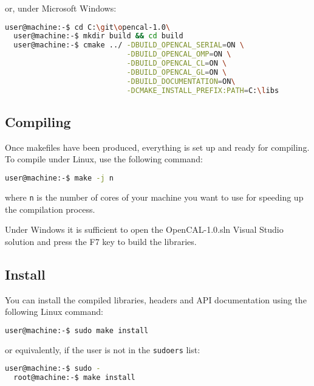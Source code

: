 \noindent or, under Microsoft Windows:

\begin{lstlisting}[numbers=none,language=bash,label={ch:quickstart:simplebuild}]
  user@machine:-$ cd C:\git\opencal-1.0\
  user@machine:-$ mkdir build && cd build
  user@machine:-$ cmake ../ -DBUILD_OPENCAL_SERIAL=ON \
                            -DBUILD_OPENCAL_OMP=ON \
                            -DBUILD_OPENCAL_CL=ON \
                            -DBUILD_OPENCAL_GL=ON \
                            -DBUILD_DOCUMENTATION=ON\
                            -DCMAKE_INSTALL_PREFIX:PATH=C:\libs
\end{lstlisting}


\subsection{Compiling}
Once makefiles have been produced, everything is set up and ready for
compiling. To compile under Linux, use the following command:

\begin{lstlisting}[numbers=none,language=bash,label={ch:quickstart:ebuild}]
  user@machine:-$ make -j n
\end{lstlisting}
where \verb'n' is the number of cores of your machine you want to use
for speeding up the compilation process.

Under Windows it is sufficient to open the OpenCAL-1.0.sln Visual
Studio solution and press the F7 key to build the libraries.

\subsection{Install}

You can install the compiled libraries, headers and API documentation
using the following Linux command:

\begin{lstlisting}[numbers=none,language=bash,label={ch:quickstart:sudoinstall}]
  user@machine:-$ sudo make install
\end{lstlisting}

\noindent or equivalently, if the user is not in the \texttt{sudoers} list:

\begin{lstlisting}[numbers=none,language=bash,label={ch:quickstart:install}]
  user@machine:-$ sudo -
  root@machine:-$ make install
\end{lstlisting}

